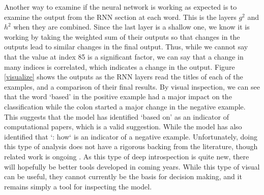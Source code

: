 \documentclass[12pt, a4paper]{article}
\begin{document}
Another way to examine if the neural network is working as expected is to examine the output from the RNN section at each word. This is the layers $g^2$ and $h^2$ when they are combined. Since the last layer is a shallow one, we know it is working by taking the weighted sum of their outputs so that changes in the outputs lead to similar changes in the final output. Thus, while we cannot say that the value at index 85 is a significant factor, we can say that a change in many indices is correlated, which indicates a change in the output. Figure \ref{visualize} shows the outputs as the RNN layers read the titles of each of the examples, and a comparison of their final results. By visual inspection, we can see that the word `based' in the positive example had a major impact on the classification while the colon started a major change in the negative example. This suggests that the model has identified `based on' as an indicator of computational papers, which is a valid suggestion. While the model has also identified that `: how` is an indicator of a negative example. Unfortunately, doing this type of analysis does not have a rigorous backing from the literature, though related work is ongoing \citep{strobelt2018lstmvis}. As this type of deep introspection is quite new, there will hopefully be better tools developed in coming years. While this type of visual can be useful, they cannot currently be the basis for decision making, and it remains simply a tool for inspecting the model.
\end{document}
